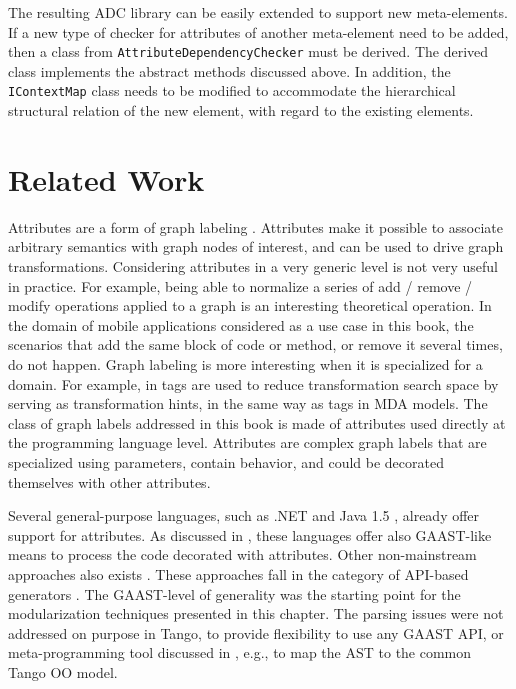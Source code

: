 The resulting ADC library can be easily extended to support new meta-elements. If a new type of checker for attributes of another meta-element need to be added, then a class from \texttt{Attri\-bu\-te\-De\-pe\-ndency\-Che\-cker} must be derived. The derived class implements the abstract methods discussed above. In addition, the \texttt{ICon\-text\-Map} class needs to be modified to accommodate the hierarchical structural relation of the new element, with regard to the existing elements. 

\section{Related Work}
\label{sec.c4.related}


Attributes are a form of graph labeling \cite{term.rewrite,Plump.95,mens.99}. Attributes make it possible to associate arbitrary semantics with graph nodes of interest, and can be used to drive graph transformations. Considering attributes in a very generic level is not very useful in practice. For example, being able to normalize a series of add / remove / modify operations applied to a graph \cite{mens.99} is an interesting theoretical operation. In the domain of mobile applications considered as a use case in this book, the scenarios that add the same block of code or method, or remove it several times, do not happen. Graph labeling is more interesting when it is specialized for a domain. For example, in \cite{Biggerstaff.ICRS6} tags are used to reduce transformation search space \cite{ptm.03} by serving as transformation hints, in the same way as tags in MDA \cite{mda.frankel} models. The class of graph labels addressed in this book is made of attributes used directly at the programming language level. Attributes are complex graph labels that are specialized using parameters, contain behavior, and could be decorated themselves with other attributes.

Several general-purpose languages, such as .NET \cite{www.dotnet} and Java 1.5 \cite{www.java.attrib.04}, already offer support for attributes. As discussed in , these languages offer also GAAST-like means to process the code decorated with attributes. Other non-mainstream approaches also exists \cite{java.explicit.programming,java.attrib4j}. These approaches fall in the category of API-based generators \cite{voelter.generation,generative.00}. The GAAST-level of generality was the starting point for the modularization techniques presented in this chapter. The parsing issues were not addressed on purpose in Tango, to provide flexibility to use any GAAST API, or meta-programming tool discussed in , e.g., \cite{java.openJava,batory98jts,java.jse,java.epp,java.maya,qdox} to map the AST to the common Tango OO model.

